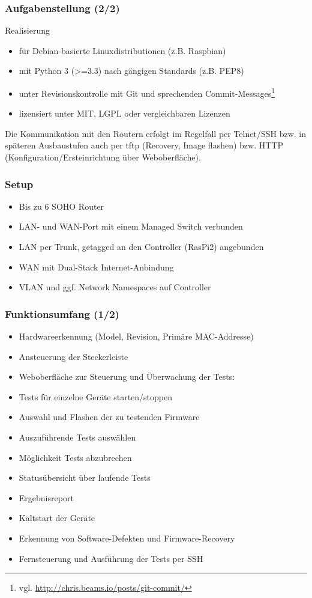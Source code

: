 \documentclass[accentcolor=tud6b,colorbacktitle,inverttitle,landscape,german,presentation,t]{tudbeamer}
\begin{document}
	\begin{frame}
		\frametitle{Aufgabenstellung (2/2)}
		\vfill
		Realisierung
		\begin{itemize}
			\item für Debian-basierte Linuxdistributionen (z.B. Raspbian)
			\item mit Python 3 (>=3.3) nach gängigen Standards (z.B. PEP8)
			\item unter Revisionskontrolle mit Git und sprechenden Commit-Messages\footnote{vgl. \url{http://chris.beams.io/posts/git-commit/}}
			\item lizensiert unter MIT, LGPL oder vergleichbaren Lizenzen
		\end{itemize}
		\vfill
		Die Kommunikation mit den Routern erfolgt im Regelfall per Telnet/SSH bzw. in späteren Ausbaustufen auch per tftp (Recovery, Image flashen) bzw. HTTP (Konfiguration/Ersteinrichtung über
		Weboberfläche).
		\vfill
	\end{frame}
	
	\begin{frame}
		\frametitle{Setup}
			\begin{itemize}
			    \item Bis zu 6 SOHO Router
		    	\item LAN- und WAN-Port mit einem Managed Switch verbunden
			    \item LAN per Trunk, getagged an den Controller (RasPi2) angebunden
			    \item WAN mit Dual-Stack Internet-Anbindung
			    \item VLAN und ggf. Network Namespaces auf Controller
		    \end{itemize}
			\vfill
	\end{frame}

	\begin{frame}
		\frametitle{Funktionsumfang (1/2)}
		\begin{itemize}
			\item Hardwareerkennung (Model, Revision, Primäre MAC-Addresse)
			\item Ansteuerung der Steckerleiste
			\item Weboberfläche zur Steuerung und Überwachung der Tests:
			\item Tests für einzelne Geräte starten/stoppen
			\item Auswahl und Flashen der zu testenden Firmware
			\item Auszuführende Tests auswählen
			\item Möglichkeit Tests abzubrechen
			\item Statusübersicht über laufende Tests
			\item Ergebnisreport
			\item Kaltstart der Geräte
			\item Erkennung von Software-Defekten und Firmware-Recovery
			\item Fernsteuerung und Ausführung der Tests per SSH
		\end{itemize}	
	\end{frame}
	
\end{document}
